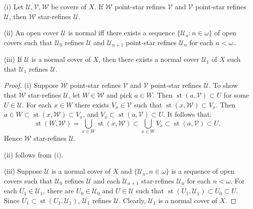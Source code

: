 \documentclass[prelim.tex]{subfiles}
\begin{document}
{\lemma{\label{lem:1.1.7}}
\textup{(i)} Let $\mathscr{U}, \mathscr{V}, \mathscr{W}$ be covers of $X$. If $\mathscr{W}$ point-star refines $\mathscr{V}$ and $\mathscr{V}$ point-star refines $\mathscr{U}$, then $\mathscr{W}$ star-refines $\mathscr{U}$.

\textup{(ii)}  An open cover $\mathscr{U}$ is normal iff there exists a sequence $\{\mathscr{U}_n: n\in\omega\}$ of open covers such that $\mathscr{U}_0$ refines $\mathscr{U}$ and  $\mathscr{U}_{n+1}$ point-star refines $\mathscr{U}_n$ for each $n<\omega$..

\textup{(iii)}  If $\mathscr{U}$ is a normal cover of $X$, then there exists a normal cover $\mathscr{U}_1$ of $X$ such that $\overline{\mathscr{U}_1}$ refines $\mathscr{U}$.
} %

\begin{proof} 
(i) Suppose $\mathscr{W}$ point-star refines $\mathscr{V}$ and $\mathscr{V}$ 
point-star refines $\mathscr{U}$. To show
that $\mathscr{W}$ star-refines $\mathscr{U}$, let $W \in \mathscr{W}$ and pick $a \in W$.
Then $\operatorname{st}(a, \mathscr{V}) \subset U$ for some $U \in \mathscr{U}$. 
For each $x \in W$ there exists $V_x \in \mathscr{V}$ such that 
$\operatorname{st}(x, \mathscr{W}) \subset V_x$. Then 
$a \in W \subset \operatorname{st}(x, \mathscr{W}) \subset V_x$, and 
$V_x \subset \operatorname{st}(a, \mathscr{V}) \subset U$. It follows that:
$$\operatorname{st}(W, \mathscr{W}) = \bigcup_{x \in W} 
\operatorname{st}(x, \mathscr{W}) \subset \bigcup_{x \in W} V_x 
\subset\operatorname{st}(a, \mathscr{V}) \subset U.$$  
Hence $\mathscr{W}$ star-refines $\mathscr{U}$.  

(ii) follows from (i). 

 (iii) Suppose $\mathscr{U}$ is a normal cover of $X$ and $\{\mathscr{U}_n, n\in\omega\}$ 
 is a sequence of open covers such that $\mathscr{U}_0$ refines $\mathscr{U}$ and each $\mathscr{U}_{n+1}$ star-refines $\mathscr{U}_n$ for each $n <\omega$. For each $U_1 \in \mathscr{U}_1$, there are 
 $U_0 \in \mathscr{U}_0$ and $U \in \mathscr{U}$ such that 
 $\operatorname{st}(U_1, \mathscr{U}_1) \subset U_0 \subset U$. 
 Since $\overline{U_1} \subset \operatorname{st}(U_1, \mathscr{U}_1)$,
 $\overline{\mathscr{U}_1}$ refines $\mathscr{U}$. 
 Clearly, $\mathscr{U}_1$ is a normal cover of $X$. 
 \end{proof} 
 	
\end{document}
